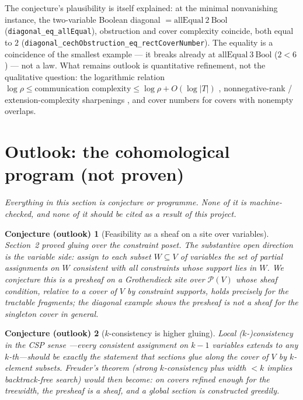 \documentclass[11pt]{article}
\newtheorem*{conjecture}{Conjecture (outlook)}
\newcommand{\lean}[1]{\texttt{#1}}
\begin{document}
The conjecture's plausibility is itself explained: at the minimal
nonvanishing instance, the two-variable Boolean diagonal
$= \mathrm{allEqual}\ 2\ \mathrm{Bool}$ (\lean{diagonal\_eq\_allEqual}),
obstruction and cover complexity coincide, both equal to $2$
(\lean{diagonal\_cechObstruction\_eq\_rectCoverNumber}).  The equality is
a coincidence of the smallest example --- it breaks already at
$\mathrm{allEqual}\ 3\ \mathrm{Bool}$ ($2 < 6$) --- not a law.  What
remains outlook is quantitative refinement, not the qualitative question:
the logarithmic relation
$\log \rho \le \text{communication complexity} \le \log \rho + O(\log|T|)$
\citep{kushilevitz1997communication}, nonnegative-rank / extension-complexity
sharpenings \citep{yannakakis1991expressing,fiorini2015exponential}, and cover
numbers for covers with nonempty overlaps.

\section{Outlook: the cohomological program (not proven)}

\emph{Everything in this section is conjecture or programme.  None of
it is machine-checked, and none of it should be cited as a result of
this project.}

\begin{conjecture}[Feasibility as a sheaf on a site over variables]
Section~2 proved gluing over the \emph{constraint} poset.  The
substantive open direction is the \emph{variable} side: assign to each
subset $W \subseteq V$ of variables the set of partial assignments on
$W$ consistent with all constraints whose support lies in $W$.  We
conjecture this is a presheaf on a Grothendieck site over
$\mathcal{P}(V)$ whose sheaf condition, relative to a cover of $V$ by
constraint supports, holds precisely for the tractable fragments; the
diagonal example shows the presheaf is not a sheaf for the singleton
cover in general.
\end{conjecture}

\begin{conjecture}[$k$-consistency is higher gluing]
Local ($k$-)consistency in the CSP sense
\citep{freuder1982backtrack,dechter2003constraint}---every consistent
assignment on $k-1$ variables extends to any $k$-th---should be
exactly the statement that sections glue along the cover of $V$ by
$k$-element subsets.  Freuder's theorem (strong $k$-consistency plus
width $< k$ implies backtrack-free search) would then become: on
covers refined enough for the treewidth, the presheaf \emph{is} a
sheaf, and a global section is constructed greedily.
\end{conjecture}
\end{document}
